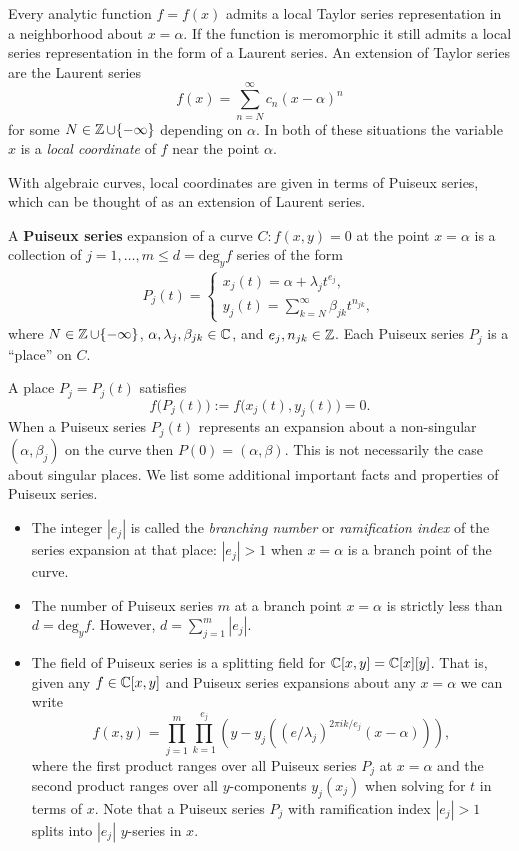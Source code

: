 Every analytic function $f = f(x)$ admits a local Taylor series representation
in a neighborhood about $x = \alpha$. If the function is meromorphic it still
admits a local series representation in the form of a Laurent series. An
extension of Taylor series are the Laurent series
\[
    f(x) = \sum_{n=N}^\infty c_n (x-\alpha)^n
\]
for some $N \in \operatorname{\mathbb{Z}} \cup \{-\infty\}$ depending on $\alpha$. In both of these
situations the variable $x$ is a {\it local coordinate} of $f$ near the point
$\alpha$.

With algebraic curves, local coordinates are given in terms of Puiseux series,
which can be thought of as an extension of Laurent series.
\begin{definition} \label{def: puiseux} A {\bf Puiseux series} expansion of a
  curve $C : f(x,y) = 0$ at the point $x=\alpha$ is a collection of $j =
  1,\ldots,m \leq d = \text{deg}_y f$ series of the form
  \begin{align*}
    P_j(t) =
    \begin{cases}
      x_j(t) = \alpha + \lambda_j t^{e_j}, \\
      y_j(t) = \sum_{k=N}^\infty \beta_{jk} t^{n_{jk}},
    \end{cases}
  \end{align*}
  where $N \in \operatorname{\mathbb{Z}} \cup \{-\infty\}$, $\alpha, \lambda_j, \beta_{jk} \in \operatorname{\mathbb{C}}$,
  and $e_j,n_{jk} \in \operatorname{\mathbb{Z}}$. Each Puiseux series $P_j$ is a ``place'' on $C$.
\end{definition}
A place $P_j = P_j(t)$ satisfies
\[
    f\big(P_j(t)\big) := f\big(x_j(t), y_j(t)\big) = 0.
\]
When a Puiseux series $P_j(t)$ represents an expansion about a non-singular
$(\alpha, \beta_j)$ on the curve then $P(0) = (\alpha,\beta)$. This is not
necessarily the case about singular places. We list some additional important
facts and properties of Puiseux series.
\begin{itemize}
\item The integer $|e_j|$ is called the {\it branching number} or {\it
    ramification index} of the series expansion at that place: $|e_j| > 1$ when
  $x = \alpha$ is a branch point of the curve.
\item The number of Puiseux series $m$ at a branch point $x = \alpha$ is
  strictly less than $d = \text{deg}_y f$. However, $d = \sum_{j=1}^m |e_j|$.
\item The field of Puiseux series is a splitting field for $\operatorname{\mathbb{C}}[x,y] =
  \operatorname{\mathbb{C}}[x][y]$. That is, given any $f \in \operatorname{\mathbb{C}}[x,y]$ and Puiseux series expansions
  about any $x=\alpha$ we can write
  \[
    f(x,y) = \prod_{j=1}^m \prod_{k=1}^{e_j} \left( y - y_j\left(
             (e/\lambda_j)^{2 \pi ik / e_j}(x-\alpha) \right) \right),
  \]
  where the first product ranges over all Puiseux series $P_j$ at $x=\alpha$ and
  the second product ranges over all $y$-components $y_j(x_j)$ when solving for
  $t$ in terms of $x$. Note that a Puiseux series $P_j$ with ramification index
  $|e_j|>1$ splits into $|e_j|$ $y$-series in $x$.
\end{itemize}

